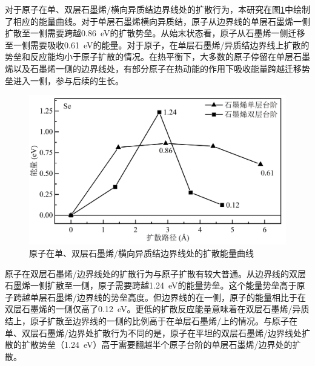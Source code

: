     对于原子在单、双层石墨烯/横向异质结边界线处的扩散行为，本研究在图\ref{fig:VS_DFT_NEB_Se_GtVSe}中绘制了相应的能量曲线。对于单层石墨烯横向异质结，原子从边界线的单层石墨烯一侧扩散至一侧需要跨越\SI{0.86}{\electronvolt}的扩散势垒。从始末状态看，原子从石墨烯一侧迁移至一侧需要吸收\SI{0.61}{\electronvolt}的能量。对于原子，在单层石墨烯/异质结边界线上扩散的势垒和反应能均小于原子扩散的情况。在热平衡下，大多数的原子停留在单层石墨烯以及石墨烯一侧的边界线处，有部分原子在热动能的作用下吸收能量跨越迁移势垒进入一侧，参与后续的生长。
    
    \begin{figure}[htb]
        \includegraphics{pic/VS_DFT_NEB_Se_GtVSe.png}
        \caption{原子在单、双层石墨烯/横向异质结边界线处的扩散能量曲线}
        \label{fig:VS_DFT_NEB_Se_GtVSe}
    \end{figure}

    原子在双层石墨烯/边界线处的扩散行为与原子扩散有较大普通。从边界线的双层石墨烯一侧扩散至一侧，原子需要跨越\SI{1.24}{\electronvolt}的能量势垒。这个能量势垒高于原子跨越单层石墨烯/边界线的势垒高度。但边界线的在一侧，原子的能量相比于在双层石墨烯的一侧仅高了\SI{0.12}{\electronvolt}。更低的扩散反应能量意味着在双层石墨烯/异质结上，原子扩散至边界线的一侧的比例高于在单层石墨烯/上的情况。与原子在单、双层石墨烯/边界处扩散行为不同的是，原子在平坦的双层石墨烯/边界线处扩散的扩散势垒（\SI{1.24}{\electronvolt}）高于需要翻越半个原子台阶的单层石墨烯/边界处的扩散。
    

